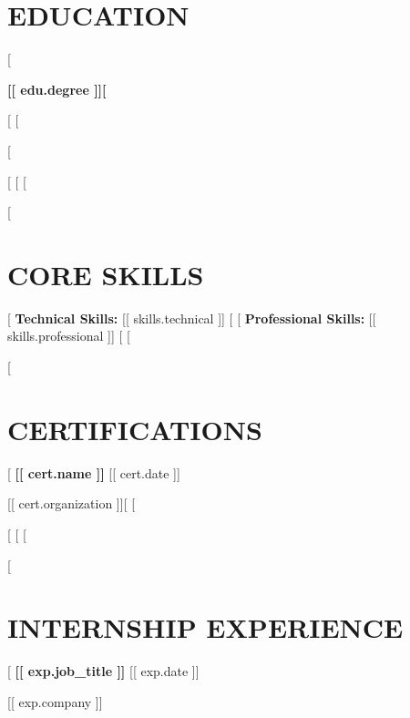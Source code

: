 \documentclass[a4paper,10pt]{article}
\begin{document}
\section{EDUCATION}
[%
{\bfseries [[ edu.degree ]][%

[%
[%

[%

[%
[%
[%

[%
\section{CORE SKILLS}
[%
{\bfseries Technical Skills:} [[ skills.technical ]]
[%
[%
{\bfseries Professional Skills:} [[ skills.professional ]]
[%
[%

[%
\section{CERTIFICATIONS}
[%
{\bfseries [[ cert.name ]]} \hfill [[ cert.date ]]

[[ cert.organization ]][%
[%

[%
[%
[%

[%
\section{INTERNSHIP EXPERIENCE}
[%
{\bfseries [[ exp.job_title ]]} \hfill [[ exp.date ]]

[[ exp.company ]]

}
\end{document}
